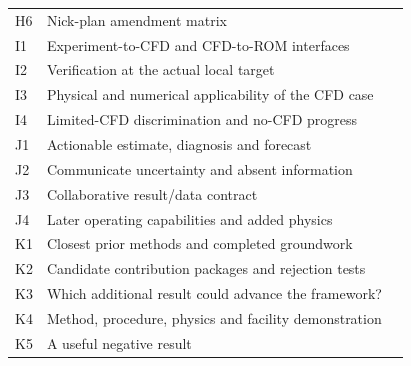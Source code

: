 \begin{longtable}{@{}p{0.45in}p{4.85in}p{0.40in}@{}}
H6 & Nick-plan amendment matrix & \hyperref[topic:nick-plan-amendment-matrix]{\pageref*{topic:nick-plan-amendment-matrix}}\\
I1 & Experiment-to-CFD and CFD-to-ROM interfaces & \hyperref[topic:experiment-to-cfd-and-cfd-to-rom-interfaces]{\pageref*{topic:experiment-to-cfd-and-cfd-to-rom-interfaces}}\\
I2 & Verification at the actual local target & \hyperref[topic:verification-at-the-actual-local-target]{\pageref*{topic:verification-at-the-actual-local-target}}\\
I3 & Physical and numerical applicability of the CFD case & \hyperref[topic:physical-and-numerical-applicability-of-the-cfd-case]{\pageref*{topic:physical-and-numerical-applicability-of-the-cfd-case}}\\
I4 & Limited-CFD discrimination and no-CFD progress & \hyperref[topic:limited-cfd-discrimination-and-no-cfd-progress]{\pageref*{topic:limited-cfd-discrimination-and-no-cfd-progress}}\\
J1 & Actionable estimate, diagnosis and forecast & \hyperref[topic:actionable-estimate-diagnosis-and-forecast]{\pageref*{topic:actionable-estimate-diagnosis-and-forecast}}\\
J2 & Communicate uncertainty and absent information & \hyperref[topic:communicate-uncertainty-and-absent-information]{\pageref*{topic:communicate-uncertainty-and-absent-information}}\\
J3 & Collaborative result/data contract & \hyperref[topic:collaborative-result-data-contract]{\pageref*{topic:collaborative-result-data-contract}}\\
J4 & Later operating capabilities and added physics & \hyperref[topic:later-operating-capabilities-and-added-physics]{\pageref*{topic:later-operating-capabilities-and-added-physics}}\\
K1 & Closest prior methods and completed groundwork & \hyperref[topic:closest-prior-methods-and-completed-groundwork]{\pageref*{topic:closest-prior-methods-and-completed-groundwork}}\\
K2 & Candidate contribution packages and rejection tests & \hyperref[topic:candidate-contribution-packages-and-rejection-tests]{\pageref*{topic:candidate-contribution-packages-and-rejection-tests}}\\
K3 & Which additional result could advance the framework? & \hyperref[topic:which-additional-result-could-advance-the-framework]{\pageref*{topic:which-additional-result-could-advance-the-framework}}\\
K4 & Method, procedure, physics and facility demonstration & \hyperref[topic:method-procedure-physics-and-facility-demonstration]{\pageref*{topic:method-procedure-physics-and-facility-demonstration}}\\
K5 & A useful negative result & \hyperref[topic:a-useful-negative-result]{\pageref*{topic:a-useful-negative-result}}\\
\end{longtable}\endgroup
